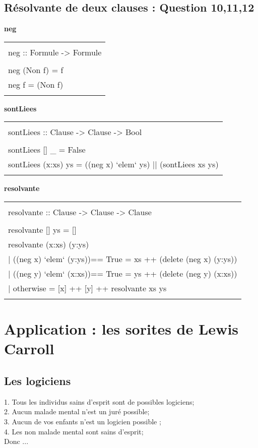 \documentclass{article}
\newenvironment{code}[1]
    {\begin{center}
    \textbf{#1\\[1ex]}
    \begin{tabular}{|p{0.9\textwidth}|}
    \hline\\
    }
    { 
    \\\\\hline
    \end{tabular} 
    \end{center}
    }
\begin{document}
\subsection{Résolvante de deux clauses : Question 10,11,12}
\begin{code}{neg}
    neg :: Formule -> Formule\\
    \\
    neg (Non f) = f\\
    neg f = (Non f)
\end{code}
\begin{code}{sontLiees}
    sontLiees :: Clause -> Clause -> Bool\\
    \\
    sontLiees [] \_ = False\\
    sontLiees (x:xs) ys = ((neg x) `elem` ys) || (sontLiees xs ys)
\end{code}
\newpage
\begin{code}{resolvante}
    resolvante :: Clause -> Clause -> Clause\\
    \\
    resolvante [] ys = []\\
    resolvante (x:xs) (y:ys)\\
    \tabto{5mm}| ((neg x) `elem` (y:ys))== True =  xs ++ (delete (neg x) (y:ys))\\
    \tabto{5mm}| ((neg y) `elem` (x:xs))== True =  ys ++ (delete (neg y) (x:xs))\\
    \tabto{5mm}| otherwise = [x] ++ [y] ++ resolvante xs ys
    
        
\end{code}
\section{Application : les sorites de Lewis Carroll}
\subsection{Les logiciens}
\tabto{0mm}1. Tous les individus sains d’esprit sont de possibles logiciens;\\
2. Aucun malade mental n’est un juré possible;\\
3. Aucun de vos enfants n’est un logicien possible ;\\
4. Les non malade mental sont sains d’esprit;\\
Donc ...\\
\end{document}
